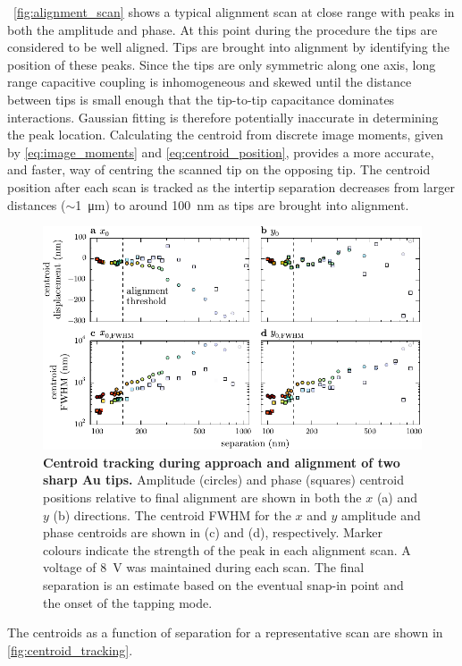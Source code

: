 \documentclass{article}
\begin{document}
\figurename~\ref{fig:alignment_scan} shows a typical alignment scan at close range with peaks in both the amplitude and phase. At this point during the procedure the tips are considered to be well aligned. Tips are  brought into alignment by identifying the position of these peaks. Since the tips are only symmetric along one axis, long range capacitive coupling is inhomogeneous and skewed until the distance between tips is small enough that the tip-to-tip capacitance dominates interactions. Gaussian fitting is therefore potentially inaccurate in determining the peak location. Calculating the centroid from discrete image moments, given by \eqref{eq:image_moments} and \eqref{eq:centroid_position}, provides a more accurate, and faster, way of centring the scanned tip on the opposing tip. The centroid position after each scan is tracked as the intertip separation decreases from larger distances ($\sim$\SI{1}{\micro\metre}) to around \SI{100}{nm} as tips are brought into alignment.
\begin{figure}[bt]
\centering
\includegraphics{figures/centroid_tracking}
\caption[Centroid tracking during approach and alignment of two sharp Au tips]{\textbf{Centroid tracking during approach and alignment of two sharp Au tips.} Amplitude (circles) and phase (squares) centroid positions relative to final alignment are shown in both the $x$ (a) and $y$ (b) directions. The centroid FWHM for the $x$ and $y$ amplitude and phase centroids are shown in (c) and (d), respectively. Marker colours indicate the strength of the peak in each alignment scan. A voltage of \SI{8}{V} was maintained during each scan. The final separation is an estimate based on the eventual snap-in point and the onset of the tapping mode.}
\label{fig:centroid_tracking}
\end{figure}
The centroids as a function of separation for a representative scan are shown in \autoref{fig:centroid_tracking}.
\end{document}
